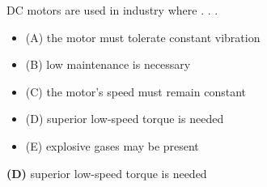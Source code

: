 

DC motors are used in industry where . . .

\begin{itemize}
\item{(A)} the motor must tolerate constant vibration
\vskip 5pt 
\item{(B)} low maintenance is necessary
\vskip 5pt 
\item{(C)} the motor's speed must remain constant
\vskip 5pt 
\item{(D)} superior low-speed torque is needed
\vskip 5pt 
\item{(E)} explosive gases may be present
\end{itemize}







{\bf (D)} superior low-speed torque is needed











